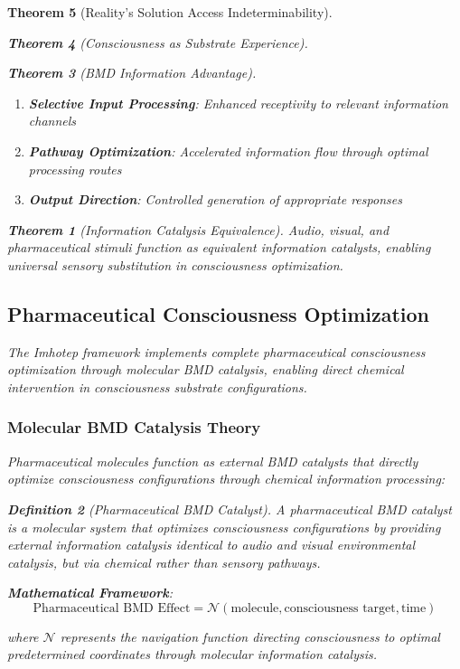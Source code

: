 \documentclass[12pt,a4paper]{article}
\newtheorem{theorem}{Theorem}[section]
\newtheorem{definition}[theorem]{Definition}
\theoremstyle{remark}
\begin{document}
\begin{theorem}[Reality's Solution Access Indeterminability]
\begin{theorem}[Consciousness as Substrate Experience]
\begin{theorem}[BMD Information Advantage]
\begin{enumerate}
\item \textbf{Selective Input Processing}: Enhanced receptivity to relevant information channels
\item \textbf{Pathway Optimization}: Accelerated information flow through optimal processing routes
\item \textbf{Output Direction}: Controlled generation of appropriate responses
\end{enumerate}

\begin{theorem}[Information Catalysis Equivalence]
Audio, visual, and pharmaceutical stimuli function as equivalent information catalysts, enabling universal sensory substitution in consciousness optimization.
\end{theorem}

\subsection{Pharmaceutical Consciousness Optimization}

The Imhotep framework implements complete pharmaceutical consciousness optimization through molecular BMD catalysis, enabling direct chemical intervention in consciousness substrate configurations.

\subsubsection{Molecular BMD Catalysis Theory}

Pharmaceutical molecules function as external BMD catalysts that directly optimize consciousness configurations through chemical information processing:

\begin{definition}[Pharmaceutical BMD Catalyst]
A pharmaceutical BMD catalyst is a molecular system that optimizes consciousness configurations by providing external information catalysis identical to audio and visual environmental catalysis, but via chemical rather than sensory pathways.
\end{definition}

\textbf{Mathematical Framework}:
$$\text{Pharmaceutical BMD Effect} = \mathcal{N}(\text{molecule}, \text{consciousness target}, \text{time})$$

where $\mathcal{N}$ represents the navigation function directing consciousness to optimal predetermined coordinates through molecular information catalysis.


\end{theorem}
\end{theorem}
\end{theorem}
\end{document}
